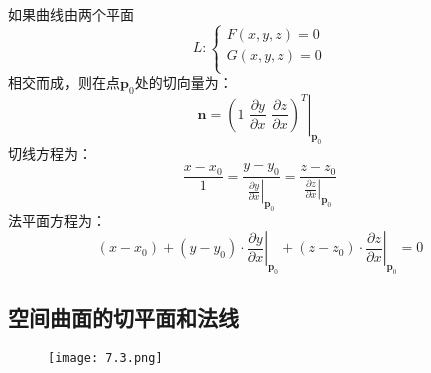 如果曲线由两个平面
\[
L:\left\{ \begin{array}{c}
	F\left( x,y,z \right) =0\\
	G\left( x,y,z \right) =0\\
\end{array} \right.
\]
相交而成，则在点$\boldsymbol{p}_0$处的切向量为：
\[
\boldsymbol{n}=\left. \left( 1\,\,\frac{\partial y}{\partial x}\,\,\frac{\partial z}{\partial x} \right) ^T \right|_{\boldsymbol{p}_0}
\]
切线方程为：
\[
\frac{x-x_0}{1}=\frac{y-y_0}{\left. \frac{\partial y}{\partial x} \right|_{\boldsymbol{p}_0}}=\frac{z-z_0}{\left. \frac{\partial z}{\partial x} \right|_{\boldsymbol{p}_0}}
\]
法平面方程为：
\[
\left( x-x_0 \right) +\left( y-y_0 \right) \cdot \left. \frac{\partial y}{\partial x} \right|_{\boldsymbol{p}_0}+\left( z-z_0 \right) \cdot \left. \frac{\partial z}{\partial x} \right|_{\boldsymbol{p}_0}=0
\]

\subsection{空间曲面的切平面和法线}

\begin{figure}[h]
\centering
\texttt{[image: 7.3.png]}
\end{figure}

